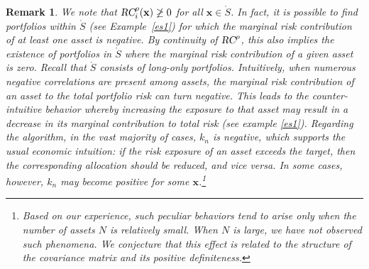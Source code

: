 \documentclass[preprint,11pt,authoryear]{elsarticle}
\newtheorem{remark}{Remark}%
\begin{document}
\begin{remark} 
We note that $\textsl{RC}^{\rho}_i(\mathbf{x}) \not \geq 0$ for all $\mathbf{x} \in \mathring{S}$. In fact, it is possible to find portfolios within $\mathring{S}$ (see Example~\ref{es1}) for which the marginal risk contribution of at least one asset is negative. By continuity of $\textsl{RC}^{\rho}$, this also implies the existence of portfolios in $\mathring{S}$ where the marginal risk contribution of a given asset is zero. Recall that $\mathring{S}$ consists of long-only portfolios. Intuitively, when numerous negative correlations are present among assets, the marginal risk contribution of an asset to the total portfolio risk can turn negative. This leads to the counter-intuitive behavior whereby increasing the exposure to that asset may result in a decrease in its 
marginal contribution to total risk (see example \ref{es1}). Regarding the algorithm, in the vast majority of cases, $k_n$ is
 negative, which supports the usual economic intuition: if the risk exposure of an asset exceeds the target, then the corresponding 
allocation should be reduced, and vice versa. In some cases, however, $k_n$ may become positive for some $\mathbf{x}$.\footnote{Based on our experience, such peculiar behaviors tend to arise only when the number of assets $N$ is relatively small. When $N$ is large, we have not observed such phenomena. We conjecture that this effect is related to the structure of the covariance matrix and its positive definiteness.}
\end{remark}
\end{document}
